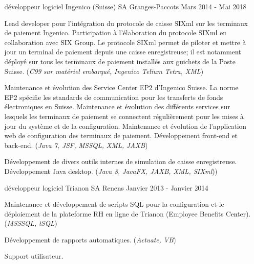 \begin{cventries}

\cventry
{développeur logiciel} %
{Ingenico (Suisse) SA} %
{Granges-Paccots} %
{Mars 2014 - Mai 2018} %
{ %
\begin{cvitems}
\item {Lead developer pour l'intégration du protocole de caisse SIXml sur les terminaux de paiement Ingenico. Participation à l'élaboration du protocole SIXml en collaboration avec SIX Group. Le protocole SIXml permet de piloter et mettre à jour un terminal de paiement depuis une caisse enregistreuse; il est notamment déployé sur tous les terminaux de paiement installés aux guichets de la Poste Suisse. (\emph{C99 sur matériel embarqué, Ingenico Telium Tetra, XML})}
\item {Maintenance et évolution des Service Center EP2 d'Ingenico Suisse. La norme EP2 spécifie les standards de communication pour les transferts de fonds électroniques en Suisse. Maintenance et évolution des différents services sur lesquels les terminaux de paiement se connectent régulièrement pour les mises à jour du système et de la configuration. Maintenance et évolution de l'application web de configuration des terminaux de paiement. Développement front-end et back-end. (\emph{Java 7, JSF, MSSQL, XML, JAXB})}
\item {Développement de divers outils internes de simulation de caisse enregistreuse. Développement Java desktop. (\emph{Java 8, JavaFX, JAXB, XML, SIXml}))}
\end{cvitems}
}


\cventry
{développeur logiciel} %
{Trianon SA} %
{Renens} %
{Janvier 2013 - Janvier 2014} %
{ %
\begin{cvitems}
\item {Maintenance et développement de scripts SQL pour la configuration et le déploiement de la plateforme RH en ligne de Trianon (Employee Benefits Center). (\emph{MSSSQL, tSQL})}
\item {Développement de rapports automatiques. (\emph{Actuate, VB})}
\item {Support utilisateur.}
\end{cvitems} 
}



\end{cventries}
